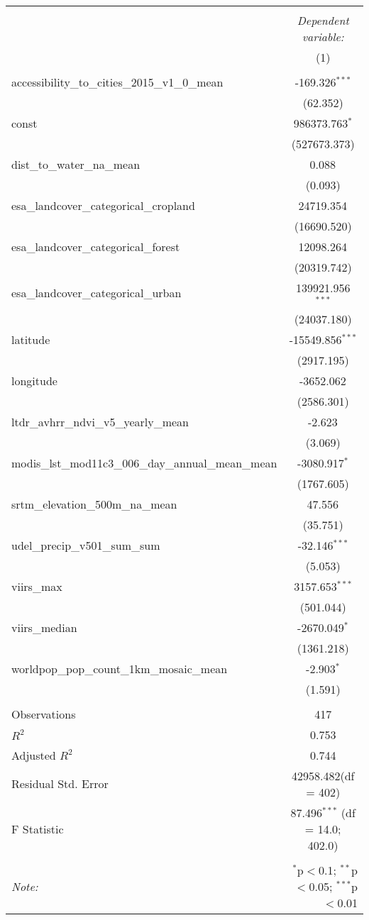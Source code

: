\begin{table}[!htbp] \centering
\begin{tabular}{@{\extracolsep{5pt}}lc}
\\[-1.8ex]\hline
\hline \\[-1.8ex]
& \multicolumn{1}{c}{\textit{Dependent variable:}} \
\cr \cline{1-2}
\\[-1.8ex] & (1) \\
\hline \\[-1.8ex]
 accessibility_to_cities_2015_v1_0_mean & -169.326$^{***}$ \\
  & (62.352) \\
 const & 986373.763$^{*}$ \\
  & (527673.373) \\
 dist_to_water_na_mean & 0.088$^{}$ \\
  & (0.093) \\
 esa_landcover_categorical_cropland & 24719.354$^{}$ \\
  & (16690.520) \\
 esa_landcover_categorical_forest & 12098.264$^{}$ \\
  & (20319.742) \\
 esa_landcover_categorical_urban & 139921.956$^{***}$ \\
  & (24037.180) \\
 latitude & -15549.856$^{***}$ \\
  & (2917.195) \\
 longitude & -3652.062$^{}$ \\
  & (2586.301) \\
 ltdr_avhrr_ndvi_v5_yearly_mean & -2.623$^{}$ \\
  & (3.069) \\
 modis_lst_mod11c3_006_day_annual_mean_mean & -3080.917$^{*}$ \\
  & (1767.605) \\
 srtm_elevation_500m_na_mean & 47.556$^{}$ \\
  & (35.751) \\
 udel_precip_v501_sum_sum & -32.146$^{***}$ \\
  & (5.053) \\
 viirs_max & 3157.653$^{***}$ \\
  & (501.044) \\
 viirs_median & -2670.049$^{*}$ \\
  & (1361.218) \\
 worldpop_pop_count_1km_mosaic_mean & -2.903$^{*}$ \\
  & (1.591) \\
\hline \\[-1.8ex]
 Observations & 417 \\
 $R^2$ & 0.753 \\
 Adjusted $R^2$ & 0.744 \\
 Residual Std. Error & 42958.482(df = 402)  \\
 F Statistic & 87.496$^{***}$ (df = 14.0; 402.0) \\
\hline
\hline \\[-1.8ex]
\textit{Note:} & \multicolumn{1}{r}{$^{*}$p$<$0.1; $^{**}$p$<$0.05; $^{***}$p$<$0.01} \\
\end{tabular}
\end{table}